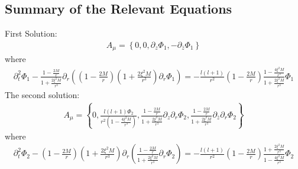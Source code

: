 \documentclass[12pt]{article}
\begin{document}
\subsection{Summary of the Relevant Equations}
First Solution:
\begin{gather}
A_{\mu}
=
\left\{
0,0,
\partial_{z}\Phi_{1}
,
-\partial_{\bar{z}}
\Phi_{1}
\right\}
\end{gather}
where
\begin{gather}
\partial^{2}_{t}
\Phi_{1}
-
\frac{1 - \frac{2 M}{r}}{1 + \frac{2 \xi^{2} M}{r^{3}}}
\partial_{r}
\left(
(1 - \frac{2 M}{r})
(1 + \frac{2 \xi^{2} M}{r^{3}})
\partial_{r}
\Phi_{1}
\right)
=
-
\frac{l (l + 1)}{r^{2}}
(1 - \frac{2 M}{r})
\frac{1 - \frac{4  \xi^{2} M}{r^{3}} }{1 + \frac{2 \xi^{2} M}{r^{3}}}
\Phi_{1}
\end{gather}
The second solution:
\begin{gather}
A_{\mu}
=
\left\{
0,\frac{l (l + 1) \Phi_{2}}{r^{2} (1 - \frac{4 \xi^{2} M}{r^{3}})}
,
\frac{1 - \frac{2 M}{r}}{1 + \frac{2 \xi^{2} M}{r^{3}} }
\partial_{z}
\partial_{r}
\Phi_{2}
,
\frac{1 - \frac{2 M}{r}}{1 + \frac{2 \xi^{2} M}{r^{3}} }
\partial_{\bar{z}}
\partial_{r}
\Phi_{2}
\right\}
\end{gather}
where
\begin{gather}
\partial_{t}^{2}
\Phi_{2}
-
(1 - \frac{2 M}{r})
(1 + \frac{2 \xi^{2} M}{r^{3}})
\partial_{r}
\left(
\frac{1 - \frac{2 M}{r}}{1 + \frac{2 \xi^{2} M}{r^{3}}}
\partial_{r}
\Phi_{2}
\right)
=-
\frac{l (l + 1)}{r^{2}}
(1 - \frac{2 M}{r})
\frac{1 + \frac{2 \xi^{2} M}{r^{3}}}{1 - \frac{4 \xi^{2} M}{r^{3}}}
\Phi_{2}
\end{gather}
\end{document}
